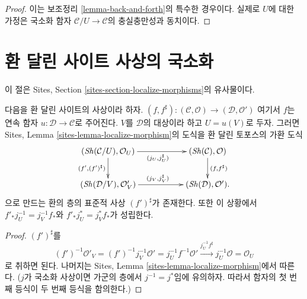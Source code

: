\begin{proof}
이는 보조정리 \ref{lemma-back-and-forth}의 특수한 경우이다. 실제로 $U$에
대한 가정은 국소화 함자 $\mathcal{C}/U \to \mathcal{C}$의 충실충만성과
동치이다.
\end{proof}









\section{환 달린 사이트 사상의 국소화}
\label{section-localize-morphisms}

\noindent
이 절은 Sites, Section \ref{sites-section-localize-morphisms}의 유사물이다.

\begin{lemma}
\label{lemma-localize-morphism-ringed-sites}
다음을 환 달린 사이트의 사상이라 하자.
$(f, f^\sharp) :
(\mathcal{C}, \mathcal{O})
\longrightarrow
(\mathcal{D}, \mathcal{O}')$
여기서 $f$는 연속 함자 $u : \mathcal{D} \to \mathcal{C}$로 주어진다.
$V$를 $\mathcal{D}$의 대상이라 하고 $U = u(V)$로 두자. 그러면
Sites, Lemma \ref{sites-lemma-localize-morphism}의 도식을 환 달린
토포스의 가환 도식
$$
\xymatrix{
(\Sh(\mathcal{C}/U), \mathcal{O}_U)
\ar[rr]_{(j_U, j_U^\sharp)} \ar[d]_{(f', (f')^\sharp)} & &
(\Sh(\mathcal{C}), \mathcal{O})
\ar[d]^{(f, f^\sharp)} \\
(\Sh(\mathcal{D}/V), \mathcal{O}'_V)
\ar[rr]^{(j_V, j_V^\sharp)} & &
(\Sh(\mathcal{D}), \mathcal{O}').
}
$$
으로 만드는 환의 층의 표준적 사상 $(f')^\sharp$가 존재한다.
또한 이 상황에서 $f'_*j_U^{-1} = j_V^{-1}f_*$와
$f'_*j_U^* = j_V^*f_*$가 성립한다.
\end{lemma}

\begin{proof}
$(f')^\sharp$를
$$
(f')^{-1}\mathcal{O}'_V =
(f')^{-1}j_V^{-1}\mathcal{O}' =
j_U^{-1}f^{-1}\mathcal{O}' \xrightarrow{j_U^{-1}f^\sharp}
j_U^{-1}\mathcal{O} = \mathcal{O}_U
$$
로 취하면 된다. 나머지는 Sites, Lemma
\ref{sites-lemma-localize-morphism}에서 따른다. ($j$가 국소화 사상이면
가군의 층에서 $j^{-1} = j^*$임에 유의하자. 따라서 함자의 첫 번째
등식이 두 번째 등식을 함의한다.)
\end{proof}

